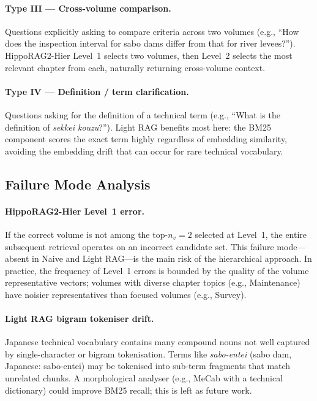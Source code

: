 \documentclass[twocolumn]{article}
\begin{document}
\paragraph{Type III --- Cross-volume comparison.}
Questions explicitly asking to compare criteria across two volumes
(e.g., ``How does the inspection interval for sabo dams differ from that for
river levees?'').
HippoRAG2-Hier Level~1 selects two volumes, then Level~2 selects the most
relevant chapter from each, naturally returning cross-volume context.

\paragraph{Type IV --- Definition / term clarification.}
Questions asking for the definition of a technical term
(e.g., ``What is the definition of \textit{sekkei kouzu}?'').
Light RAG benefits most here: the BM25 component scores the exact term
highly regardless of embedding similarity, avoiding the embedding drift
that can occur for rare technical vocabulary.

\subsection{Failure Mode Analysis}

\paragraph{HippoRAG2-Hier Level~1 error.}
If the correct volume is not among the top-$n_v = 2$ selected at Level~1,
the entire subsequent retrieval operates on an incorrect candidate set.
This failure mode---absent in Naive and Light RAG---is the main risk of
the hierarchical approach.
In practice, the frequency of Level~1 errors is bounded by the quality of
the volume representative vectors; volumes with diverse chapter topics
(e.g., Maintenance) have noisier representatives than focused volumes
(e.g., Survey).

\paragraph{Light RAG bigram tokeniser drift.}
Japanese technical vocabulary contains many compound nouns not well captured
by single-character or bigram tokenisation.
Terms like \textit{sabo-entei} (sabo dam, Japanese: \mbox{sabo-entei}) may be tokenised into sub-term fragments
that match unrelated chunks.
A morphological analyser (e.g., MeCab with a technical dictionary) could
improve BM25 recall; this is left as future work.
\end{document}
